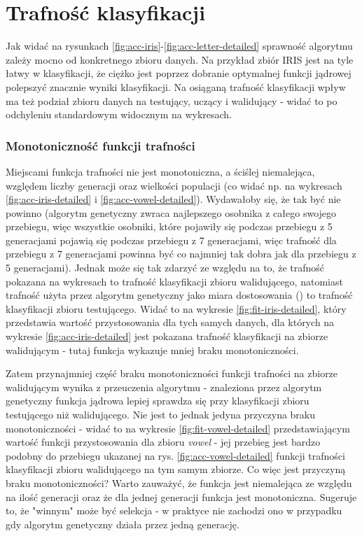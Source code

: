 	
\FloatBarrier
\section{Trafność klasyfikacji}
	Jak widać na rysunkach \ref{fig:acc-iris}-\ref{fig:acc-letter-detailed} sprawność algorytmu zależy mocno od konkretnego zbioru danych. Na przykład zbiór IRIS jest na tyle łatwy w klasyfikacji, że ciężko jest poprzez dobranie optymalnej funkcji jądrowej polepszyć znacznie wyniki klasyfikacji.
	Na osiąganą trafność klasyfikacji wpływ ma też podział zbioru danych na testujący, uczący i walidujący - widać to po odchyleniu standardowym widocznym na wykresach.
	
	\subsubsection{Monotoniczność funkcji trafności}
	
	Miejscami funkcja trafności nie jest monotoniczna, a ściślej niemalejąca, względem liczby generacji oraz wielkości populacji (co widać np. na wykresach \ref{fig:acc-iris-detailed} i \ref{fig:acc-vowel-detailed}). Wydawałoby się, że tak być nie powinno (algorytm genetyczny zwraca najlepszego osobnika z całego swojego przebiegu, więc wszystkie osobniki, które pojawiły się podczas przebiegu z 5 generacjami pojawią się podczas przebiegu z 7 generacjami, więc trafność dla przebiegu z 7 generacjami powinna być co najmniej tak dobra jak dla przebiegu z 5 generacjami). Jednak może się tak zdarzyć ze względu na to, że trafność pokazana na wykresach to trafność klasyfikacji zbioru walidującego, natomiast trafność użyta przez algorytm genetyczny jako miara dostosowania () to trafność klasyfikacji zbioru testującego. Widać to na wykresie \ref{fig:fit-iris-detailed}, który przedstawia wartość przystosowania dla tych samych danych, dla których na wykresie \ref{fig:acc-iris-detailed} jest pokazana trafność klasyfikacji na zbiorze walidującym - tutaj funkcja wykazuje mniej braku monotoniczności. 
	
	Zatem przynajmniej część braku monotoniczności funkcji trafności na zbiorze walidującym wynika z przeuczenia algorytmu - znaleziona przez algorytm genetyczny funkcja jądrowa lepiej sprawdza się przy klasyfikacji zbioru testującego niż walidującego. Nie jest to jednak jedyna przyczyna braku monotoniczności - widać to na wykresie \ref{fig:fit-vowel-detailed} przedstawiającym wartość funkcji przystosowania dla zbioru \emph{vowel} - jej przebieg jest bardzo podobny do przebiegu ukazanej na rys. \ref{fig:acc-vowel-detailed} funkcji trafności klasyfikacji zbioru walidującego na tym samym zbiorze. Co więc jest przyczyną braku monotoniczności? Warto zauważyć, że funkcja jest niemalejąca ze względu na ilość generacji oraz że dla jednej generacji funkcja jest monotoniczna. Sugeruje to, że "winnym" może być selekcja - w praktyce nie zachodzi ono w przypadku gdy algorytm genetyczny działa przez jedną generację.
    
